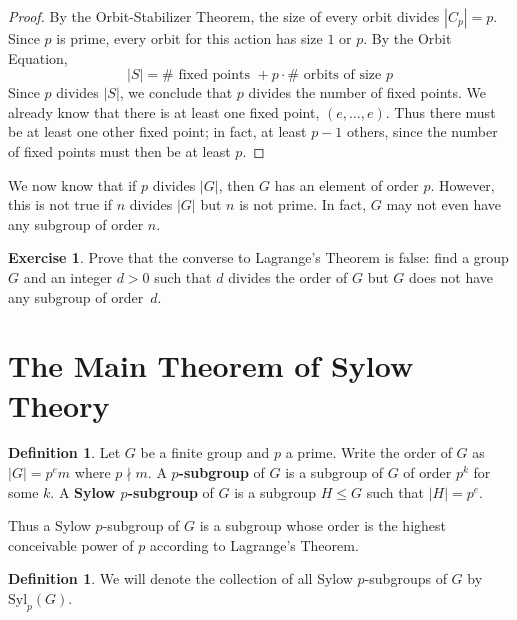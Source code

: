 \documentclass[12pt]{report}
\numberwithin{equation}{section}
\numberwithin{theorem}{chapter}
\theoremstyle{definition}
\newtheorem{definition}[theorem]{Definition}
\newtheorem{exercise}{Exercise}
\newtheorem*{basic properties}{Basic Properties}
\newtheorem*{Important Remark}{Important Remark}
\newcommand{\df}[1]{{\bf #1}\index{#1}}
\begin{document}
\begin{proof}
By the Orbit-Stabilizer Theorem, the size of every orbit divides $|C_p| = p$. Since $p$ is prime, every orbit for this action has size $1$ or $p$. By the Orbit Equation,
$$|S| = \# \text{ fixed points } + p \cdot \# \text{ orbits of size } p$$
Since $p$ divides $|S|$, we conclude that $p$ divides the number of fixed points. 
We already know that there is at least one fixed point, $(e, \dots, e)$.
Thus there must be at least one other fixed point; in fact, at least $p-1$ others, since the number of fixed points must then be at least $p$.
\end{proof}



We now know that if $p$ divides $|G|$, then $G$ has an element of order $p$.
However, this is not true if $n$ divides $|G|$ but $n$ is not prime. In fact, $G$ may not even have any subgroup of order $n$.



\begin{exercise}
Prove that the converse to Lagrange's Theorem is false: find a group $G$ and an integer $d>0$ such that $d$ divides the order of $G$ but $G$ does not have any subgroup of order~$d$.	
\end{exercise}




	

\section{The Main Theorem of Sylow Theory}

\begin{definition}
Let $G$ be a finite group and $p$ a prime. Write the order of $G$ as $|G| = p^e m$ where $p \nmid m$.
A \df{$p$-subgroup} of $G$ is a subgroup of $G$ of order $p^k$ for some $k$.
A \df{Sylow $p$-subgroup} of $G$ is a subgroup $H \leq G$ such that $|H| = p^e$. 
\end{definition}


Thus a Sylow $p$-subgroup of $G$ is a subgroup whose order is the highest
conceivable power of $p$ according to Lagrange's Theorem. 

\begin{definition}
	We will denote the collection of all Sylow $p$-subgroups of $G$ by $\mathrm{Syl}_p(G)$.	
\end{definition}
\end{document}

